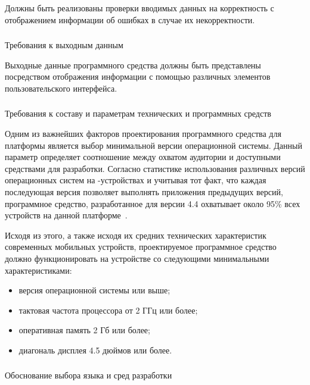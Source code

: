 Должны быть реализованы проверки вводимых данных на корректность с отображением информации об ошибках в случае их некорректности.

\subsubsection{} Требования к выходным данным
\label{sec:analysis:specification:outputs}

Выходные данные программного средства должны быть представлены посредством отображения информации с помощью различных элементов пользовательского интерфейса.

\subsubsection{} Требования к составу и параметрам технических и программных средств
\label{sec:analysis:specification:minimal_requirements}

Одним из важнейших факторов проектирования программного средства для платформы \andro является выбор минимальной версии операционной системы.
Данный параметр определяет соотношение между охватом аудитории и доступными средствами для разработки.
Согласно статистике использования различных версий операционных систем на \andro-устройствах и учитывая тот факт, что каждая последующая версия позволяет выполнять приложения предыдущих версий, программное средство, разработанное для версии 4.4 охватывает около 95\% всех устройств на данной платформе~\cite{android_dashboard}.

Исходя из этого, а также исходя их средних технических характеристик современных мобильных устройств, проектируемое программное средство должно функционировать на устройстве со следующими минимальными характеристиками:
\begin{itemize}
    \item версия операционной системы  или выше;
    \item тактовая частота процессора от 2 ГГц или более;
    \item оперативная память 2 Гб или более;
    \item диагональ дисплея 4.5 дюймов или более.
\end{itemize}

\subsubsection{} Обоснование выбора языка и сред разработки
\label{sec:analysis:specification:lang_rationale}

